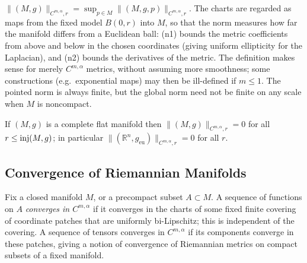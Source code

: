 \begin{definition}
  \label{def:pet-ch11-cmalpha-norm-global}
  $\|(M,g)\|_{C^{m,\alpha},r}=\sup_{p\in M}\|(M,g,p)\|_{C^{m,\alpha},r}$. The
  charts are regarded as maps from the fixed model $B(0,r)$ into $M$, so that
  the norm measures how far the manifold differs from a Euclidean ball: (n1)
  bounds the metric coefficients from above and below in the chosen
  coordinates (giving uniform ellipticity for the Laplacian), and (n2)
  bounds the derivatives of the metric. The definition makes sense for
  merely $C^{m,\alpha}$ metrics, without assuming more smoothness; some
  constructions (e.g.\ exponential maps) may then be ill-defined if $m\le1$.
  The pointed norm is always finite, but the global norm need not be finite
  on any scale when $M$ is noncompact.
\end{definition}

\begin{example}
  \label{ex:pet-ch11-flat-manifold-norm-zero}
  If $(M,g)$ is a complete flat manifold then $\|(M,g)\|_{C^{m,\alpha},r}=0$
  for all $r\le\operatorname{inj}(M,g)$; in particular
  $\|(\mathbb{R}^n,g_{\mathrm{eu}})\|_{C^{m,\alpha},r}=0$ for all $r$.
\end{example}

\subsection{Convergence of Riemannian Manifolds}

\begin{definition}
  \label{def:pet-ch11-tensor-convergence-compact-subset}
  Fix a closed manifold $M$, or a precompact subset $A\subset M$. A sequence
  of functions on $A$ \emph{converges in $C^{m,\alpha}$} if it converges in
  the charts of some fixed finite covering of coordinate patches that are
  uniformly bi-Lipschitz; this is independent of the covering. A sequence of
  tensors converges in $C^{m,\alpha}$ if its components converge in these
  patches, giving a notion of convergence of Riemannian metrics on compact
  subsets of a fixed manifold.
\end{definition}

